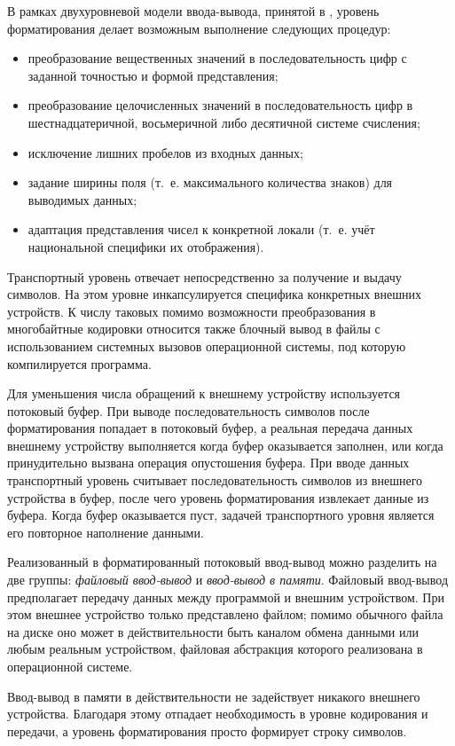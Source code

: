 В рамках двухуровневой модели ввода-вывода, принятой в , 
уровень форматирования делает возможным выполнение следующих
процедур:

\begin{itemize}
\item преобразование вещественных значений в последовательность цифр с заданной точностью и формой представления;
\item преобразование целочисленных значений в последовательность цифр в шестнадцатеричной, восьмеричной либо десятичной
системе счисления;
\item исключение лишних пробелов из входных данных;
\item задание ширины поля (т.~е. максимального количества знаков) для выводимых данных;
\item адаптация представления чисел к конкретной локали (т.~е. учёт национальной специфики их отображения).
\end{itemize}
Транспортный уровень отвечает непосредственно за получение и выдачу символов. На этом уровне инкапсулируется специфика
конкретных внешних устройств. К числу таковых помимо возможности преобразования в многобайтные кодировки относится
также блочный вывод в файлы с использованием системных вызовов операционной системы, под которую компилируется
программа.

 Для уменьшения числа обращений к внешнему устройству используется потоковый буфер. При выводе последовательность
символов после форматирования попадает в потоковый буфер, а реальная передача данных внешнему устройству выполняется
когда буфер оказывается заполнен, или когда принудительно вызвана операция опустошения буфера. При вводе данных
транспортный уровень считывает последовательность символов из внешнего устройства в буфер, после чего уровень
форматирования извлекает данные из буфера. Когда буфер оказывается пуст, задачей транспортного уровня является его
повторное наполнение данными.

Реализованный в  форматированный потоковый ввод-вывод можно разделить на две группы: \emph{файловый 
ввод-вывод} и \emph{ввод-вывод в памяти}. Файловый ввод-вывод предполагает передачу данных между
программой и внешним устройством. При этом внешнее устройство только представлено файлом; помимо обычного файла на
диске оно может в действительности быть каналом обмена данными или любым реальным устройством, файловая абстракция
которого реализована в операционной системе. 

Ввод-вывод в памяти в действительности не задействует никакого внешнего устройства. Благодаря этому отпадает
необходимость в уровне кодирования и передачи, а уровень форматирования просто формирует строку символов. 


